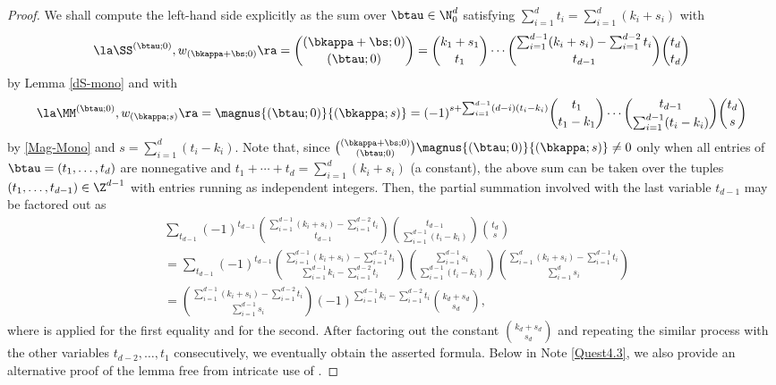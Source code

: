 \begin{proof}
We shall compute the left-hand side explicitly
as the sum over 
$\btau\in\N_0^d$ satisfying
$\sum_{i=1}^d t_i=\sum_{i=1}^d (k_i+s_i)$
with
$$
\la\SS^{(\btau;0)},w_{(\bkappa+\bs;0)}\ra=\binom{(\bkappa+\bs;0)}{(\btau;0)}
=\binom{k_1+s_1}{t_1} 
\cdots
\binom{\sum_{i=1}^{d-1}(k_i+s_i)-\sum_{i=1}^{d-2}t_i}{t_{d-1}}
\binom{t_d}{t_d}
$$
by Lemma \ref{dS-mono} and with
\small $$
\la\MM^{(\btau;0)}, w_{(\bkappa;s)}\ra
=\magnus{(\btau;0)}{(\bkappa;s)}
=(-1)^{s+\sum_{i=1}^{d-1}(d-i)(t_i-k_i)}
\binom{t_1}{t_1-k_1}
\cdots
\binom{t_{d-1}}{\sum_{i=1}^{d-1}(t_i-k_i)}
\binom{t_d}{s}
$$ \normalsize
by \eqref{Mag-Mono} and
$s=\sum_{i=1}^{d}(t_i-k_i)$. 
Note that,
since $\binom{(\bkappa+\bs;0)}{(\btau;0)}\magnus{(\btau;0)}{(\bkappa;s)}\ne 0$ 
only when all entries of $\btau=(t_1,\dots,t_d)$ are nonnegative
and $t_1+\cdots+t_d=\sum_{i=1}^d (k_i+s_i)$ (a constant),
the above sum
can be taken over the tuples $(t_1,\dots,t_{d-1})\in\Z^{d-1}$
with entries running as independent integers.
Then, the partial summation involved with the last variable 
$t_{d-1}$ may be factored out as
\small \begin{align*}
&\sum_{t_{d-1}}(-1)^{t_{d-1}}
\binom{\sum_{i=1}^{d-1}(k_i+s_i)-\sum_{i=1}^{d-2}t_i}{t_{d-1}}
\binom{t_{d-1}}{\sum_{i=1}^{d-1}(t_i-k_i)}
\binom{t_d}{s} \\
&=\sum_{t_{d-1}}(-1)^{t_{d-1}}
\binom{\sum_{i=1}^{d-1}(k_i+s_i)-\sum_{i=1}^{d-2}t_i}{ \sum_{i=1}^{d-1}k_i-\sum_{i=1}^{d-2}t_i }
\binom{\sum_{i=1}^{d-1} s_i}{\sum_{i=1}^{d-1}(t_i-k_i)}
\binom{\sum_{i=1}^d(k_i+s_i)-\sum_{i=1}^{d-1}t_i}{\sum_{i=1}^{d} s_i} \\
&=\binom{\sum_{i=1}^{d-1}(k_i+s_i)-\sum_{i=1}^{d-2}t_i}{\sum_{i=1}^{d-1} s_i}
(-1)^{\sum_{i=1}^{d-1}k_i -\sum_{i=1}^{d-2} t_i}
\binom{k_d+s_d}{s_d},
\end{align*} \normalsize
where \cite[(5.21)]{GKP} is applied for the first equality and 
\cite[(5.24)]{GKP} for the second.
After factoring out the constant $\binom{k_d+s_d}{s_d}$ and repeating
the similar process with the other variables $t_{d-2},\dots, t_1$ consecutively,
we eventually obtain the asserted formula.
Below in Note \ref{Quest4.3}, we also provide an alternative proof of the lemma 
free from intricate use of 
\cite[(5.21),(5.24)]{GKP}.
\end{proof}

